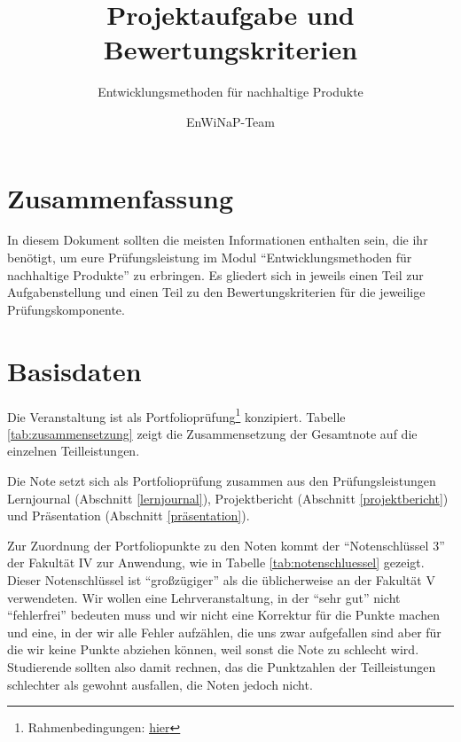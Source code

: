 \documentclass[DIV=15,headinclude=true]{scrreprt}
\begin{document}
\title{Projektaufgabe und Bewertungskriterien}
\subtitle{Entwicklungsmethoden für nachhaltige Produkte}
\author{EnWiNaP-Team}
\maketitle

\chapter*{Zusammenfassung}

In diesem Dokument sollten die meisten Informationen enthalten sein, die ihr benötigt, um eure Prüfungsleistung im Modul "`Entwicklungsmethoden für nachhaltige Produkte"' zu erbringen. Es gliedert sich in jeweils einen Teil zur Aufgabenstellung und einen Teil zu den Bewertungskriterien für die jeweilige Prüfungskomponente.


\tableofcontents



\chapter{Basisdaten}

Die Veranstaltung ist als Portfolioprüfung\footnote{Rahmenbedingungen:
	\href{https://www.tu-berlin.de/asv/menue/gremien/kommissionen_des_as/hinweise_zur_allgstupo/hinweise_zu_portfoliopruefungen/}{\underline{hier}}}
konzipiert. Tabelle \ref{tab:zusammensetzung} zeigt die
Zusammensetzung der Gesamtnote auf die einzelnen Teilleistungen.

Die Note setzt sich als Portfolioprüfung zusammen aus den Prüfungsleistungen Lernjournal (Abschnitt \ref{lernjournal}), Projektbericht (Abschnitt \ref{projektbericht}) und Präsentation (Abschnitt \ref{präsentation}).

Zur Zuordnung der Portfoliopunkte zu den Noten kommt der
\enquote{Notenschlüssel 3} der Fakultät IV zur Anwendung, wie in Tabelle
\ref{tab:notenschluessel} gezeigt. Dieser
Notenschlüssel ist \enquote{großzügiger} als die üblicherweise an der
Fakultät V verwendeten. Wir wollen eine Lehrveranstaltung, in der
\enquote{sehr gut} nicht \enquote{fehlerfrei} bedeuten muss und wir
nicht eine Korrektur für die Punkte machen und eine, in der wir alle
Fehler aufzählen, die uns zwar aufgefallen sind aber für die wir keine
Punkte abziehen können, weil sonst die Note zu schlecht wird.
Studierende sollten also damit rechnen, das die Punktzahlen der
Teilleistungen schlechter als gewohnt ausfallen, die Noten jedoch nicht.
\end{document}
